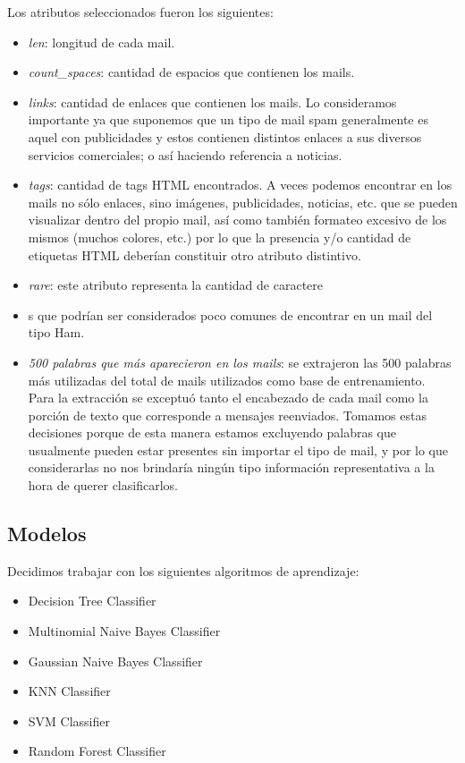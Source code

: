\documentclass[a4paper]{article}
\newcounter{col}
\begin{document}
Los atributos seleccionados fueron los siguientes:
\begin{itemize}
\item \textit{len}: longitud de cada mail.
\item \textit{count\_spaces}: cantidad de espacios que contienen los mails.
\item \textit{links}: cantidad de enlaces que contienen los mails. Lo consideramos importante ya que suponemos que un tipo de mail spam generalmente es aquel con publicidades y estos contienen distintos enlaces a sus diversos servicios comerciales; o así haciendo referencia a noticias.
\item \textit{tags}: cantidad de tags HTML encontrados. A veces podemos encontrar en los mails no sólo enlaces, sino imágenes, publicidades, noticias, etc. que se pueden visualizar dentro del propio mail, así como también formateo excesivo de los mismos (muchos colores, etc.) por lo que la presencia y/o cantidad de etiquetas HTML deberían constituir otro atributo distintivo.
\item \textit{rare}: este atributo representa la cantidad de caractere
\item 
s que podrían ser considerados poco comunes de encontrar en un mail del tipo Ham.
\item \textit{500 palabras que más aparecieron en los mails}: se extrajeron las 500 palabras más utilizadas del total de mails utilizados como base de entrenamiento. \\
Para la extracción se exceptuó tanto el encabezado de cada mail como la porción de texto que corresponde a mensajes reenviados. Tomamos estas decisiones porque de esta manera estamos excluyendo palabras que usualmente pueden estar presentes sin importar el tipo de mail, y por lo que considerarlas no nos brindaría ningún tipo información representativa a la hora de querer clasificarlos.     
\end{itemize}

\subsection{Modelos}
Decidimos trabajar con los siguientes algoritmos de aprendizaje:

\begin{itemize}
	\item Decision Tree Classifier
	\item Multinomial Naive Bayes Classifier
	\item Gaussian Naive Bayes Classifier
	\item KNN Classifier
	\item SVM Classifier
	\item Random Forest Classifier
\end{itemize}
\end{document}
